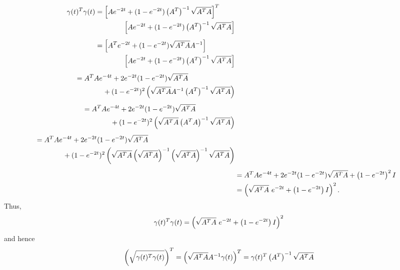 \begin{align*}
    \begin{split}
		\gamma(t)^T\gamma(t) & = \left[ Ae^{-2t}+(1-e^{-2t})\left( A^T \right)^{-1}\sqrt{A^TA} \right]^T\\
        & \qquad \qquad \left[ Ae^{-2t}+(1-e^{-2t})\left( A^T \right)^{-1}\sqrt{A^TA} \right]  
    \end{split}
    \\[1ex]
    \begin{split}
        & = \left[ A^Te^{-2t} +(1-e^{-2t})\sqrt{A^TA} A^{-1} \right] \\
        & \qquad \qquad \left[ Ae^{-2t}+(1-e^{-2t})\left( A^T \right)^{-1}\sqrt{A^TA} \right]
    \end{split}
    \\[1ex]
    \begin{split}
        & = A^TAe^{-4t} + 2e^{-2t}(1-e^{-2t})\sqrt{A^TA}\\
        & \qquad \qquad +(1-e^{-2t})^2\left( \sqrt{A^TA} A^{-1} \left( A^T \right)^{-1} \sqrt{A^TA} \right)
    \end{split}
    \\[1ex] 
    \begin{split}
        & = A^TAe^{-4t} + 2e^{-2t}(1-e^{-2t})\sqrt{A^TA}\\
        & \qquad \qquad +(1-e^{-2t})^2\left( \sqrt{A^TA} \left( A^TA \right)^{-1} \sqrt{A^TA} \right)
    \end{split}
    \\[1ex]
    \begin{split}
        & = A^TAe^{-4t} + 2e^{-2t}(1-e^{-2t})\sqrt{A^TA}\\
        & \qquad \qquad +(1-e^{-2t})^2\left( \sqrt{A^TA} \left( \sqrt{A^TA} \right)^{-1} \left( \sqrt{A^TA} \right)^{-1} \sqrt{A^TA} \right)
    \end{split}
    \\[1ex] 
    & = A^TAe^{-4t} + 2e^{-2t}(1-e^{-2t})\sqrt{A^TA} + \left( 1-e^{-2t} \right)^2I\\
    & = \left( \sqrt{A^TA}~e^{-2t}+\left( 1-e^{-2t} \right)I \right)^2.
\end{align*}
Thus,
\begin{displaymath}
    \gamma(t)^T\gamma(t) = \left( \sqrt{A^TA}~e^{-2t}+\left( 1-e^{-2t} \right)I \right)^2
\end{displaymath}
and hence
\begin{displaymath}
    \left( \sqrt{\gamma(t)^T\gamma(t)} \right)^T = \left( \sqrt{A^TA}A^{-1}\gamma(t) \right)^T = \gamma(t)^T\left( A^T \right)^{-1} \sqrt{A^TA}
\end{displaymath}

